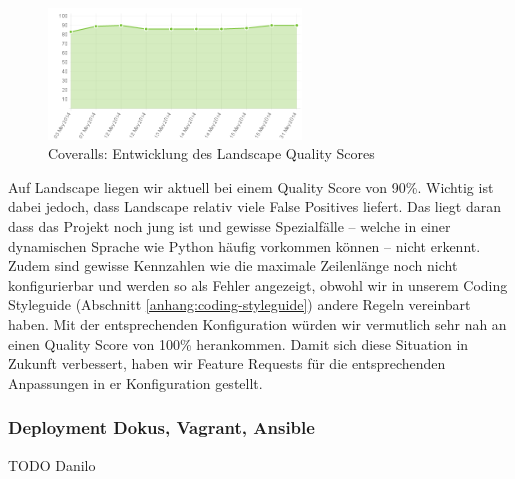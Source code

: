 \begin{figure}[H]
	\centering
	\includegraphics[width=0.6\textwidth]{images/landscape}
	\caption{Coveralls: Entwicklung des Landscape Quality Scores}
	\label{improvements:landscape}
\end{figure}

Auf Landscape liegen wir aktuell bei einem Quality Score von 90\%. Wichtig ist
dabei jedoch, dass Landscape relativ viele False Positives liefert. Das liegt
daran dass das Projekt noch jung ist und gewisse Spezialfälle -- welche in einer
dynamischen Sprache wie Python häufig vorkommen können -- nicht erkennt. Zudem
sind gewisse Kennzahlen wie die maximale Zeilenlänge noch nicht konfigurierbar
und werden so als Fehler angezeigt, obwohl wir in unserem Coding Styleguide
(Abschnitt \ref{anhang:coding-styleguide}) andere Regeln vereinbart haben. Mit
der entsprechenden Konfiguration würden wir vermutlich sehr nah an einen Quality
Score von 100\% herankommen. Damit sich diese Situation in Zukunft verbessert,
haben wir Feature Requests für die entsprechenden Anpassungen in er
Konfiguration gestellt.


\subsubsection{Deployment Dokus, Vagrant, Ansible}

TODO Danilo

